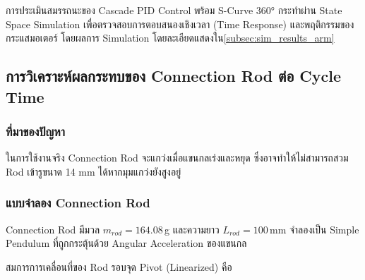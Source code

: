 การประเมินสมรรถนะของ Cascade PID Control พร้อม S-Curve 360° กระทำผ่าน State Space Simulation เพื่อตรวจสอบการตอบสนองเชิงเวลา (Time Response) และพฤติกรรมของกระแสมอเตอร์ โดยผลการ Simulation โดยละเอียดแสดงใน\cref{subsec:sim_results_arm}

\subsection{การวิเคราะห์ผลกระทบของ Connection Rod ต่อ Cycle Time}
\label{subsec:rod_effect_analysis}

\subsubsection{ที่มาของปัญหา}
\label{subsubsec:problem_origin}

ในการใช้งานจริง Connection Rod จะแกว่งเมื่อแขนกลเร่งและหยุด ซึ่งอาจทำให้ไม่สามารถสวม Rod เข้ารูขนาด 14 mm ได้หากมุมแกว่งยังสูงอยู่

\subsubsection{แบบจำลอง Connection Rod}
\label{subsubsec:connection_rod_modeling}

Connection Rod มีมวล $m_{rod} = 164.08$\,g และความยาว $L_{rod} = 100$\,mm จำลองเป็น Simple Pendulum ที่ถูกกระตุ้นด้วย Angular Acceleration ของแขนกล

สมการการเคลื่อนที่ของ Rod รอบจุด Pivot (Linearized) คือ

